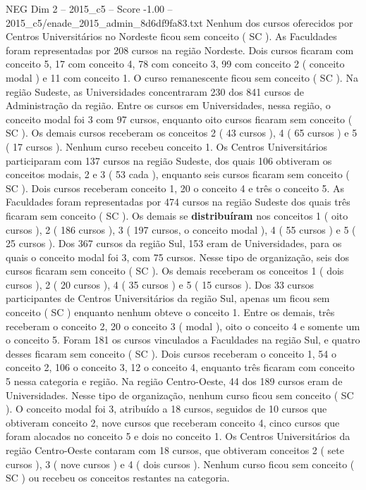 \begin{textsample}{NEG Dim 2 – 2015\_c5 – Score -1.00 – 2015\_c5/enade\_2015\_admin\_8d6df9fa83.txt}
Nenhum dos cursos oferecidos por Centros Universitários no Nordeste ficou sem conceito ( SC ).
As Faculdades foram representadas por 208 cursos na região Nordeste.
Dois cursos ficaram com conceito 5, 17 com conceito 4, 78 com conceito 3, 99 com conceito 2 ( conceito modal ) e 11 com conceito 1.
O curso remanescente ficou sem conceito ( SC ).
Na região Sudeste, as Universidades concentraram 230 dos 841 cursos de Administração da região.
Entre os cursos em Universidades, nessa região, o conceito modal foi 3 com 97 cursos, enquanto oito cursos ficaram sem conceito ( SC ).
Os demais cursos receberam os conceitos 2 ( 43 cursos ), 4 ( 65 cursos ) e 5 ( 17 cursos ).
Nenhum curso recebeu conceito 1.
Os Centros Universitários participaram com 137 cursos na região Sudeste, dos quais 106 obtiveram os conceitos modais, 2 e 3 ( 53 cada ), enquanto seis cursos ficaram sem conceito ( SC ).
Dois cursos receberam conceito 1, 20 o conceito 4 e três o conceito 5.
As Faculdades foram representadas por 474 cursos na região Sudeste dos quais três ficaram sem conceito ( SC ).
Os demais se \textbf{distribuíram} nos conceitos 1 ( oito cursos ), 2 ( 186 cursos ), 3 ( 197 cursos, o conceito modal ), 4 ( 55 cursos ) e 5 ( 25 cursos ).
Dos 367 cursos da região Sul, 153 eram de Universidades, para os quais o conceito modal foi 3, com 75 cursos.
Nesse tipo de organização, seis dos cursos ficaram sem conceito ( SC ).
Os demais receberam os conceitos 1 ( dois cursos ), 2 ( 20 cursos ), 4 ( 35 cursos ) e 5 ( 15 cursos ).
Dos 33 cursos participantes de Centros Universitários da região Sul, apenas um ficou sem conceito ( SC ) enquanto nenhum obteve o conceito 1.
Entre os demais, três receberam o conceito 2, 20 o conceito 3 ( modal ), oito o conceito 4 e somente um o conceito 5.
Foram 181 os cursos vinculados a Faculdades na região Sul, e quatro desses ficaram sem conceito ( SC ).
Dois cursos receberam o conceito 1, 54 o conceito 2, 106 o conceito 3, 12 o conceito 4, enquanto três ficaram com conceito 5 nessa categoria e região.
Na região Centro-Oeste, 44 dos 189 cursos eram de Universidades.
Nesse tipo de organização, nenhum curso ficou sem conceito ( SC ).
O conceito modal foi 3, atribuído a 18 cursos, seguidos de 10 cursos que obtiveram conceito 2, nove cursos que receberam conceito 4, cinco cursos que foram alocados no conceito 5 e dois no conceito 1.
Os Centros Universitários da região Centro-Oeste contaram com 18 cursos, que obtiveram conceitos 2 ( sete cursos ), 3 ( nove cursos ) e 4 ( dois cursos ).
Nenhum curso ficou sem conceito ( SC ) ou recebeu os conceitos restantes na categoria.

\end{textsample}
